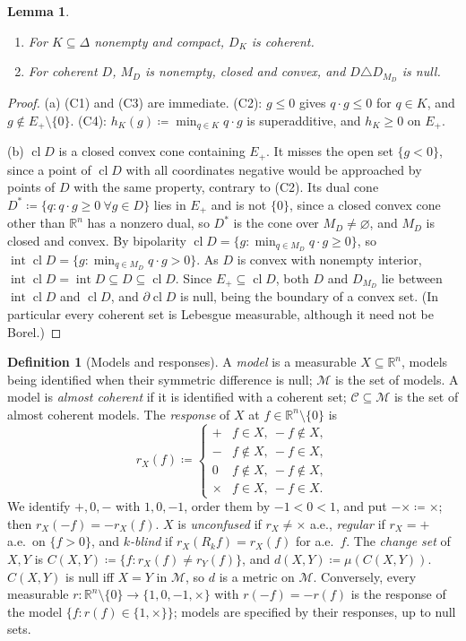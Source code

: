 \documentclass[11pt]{article}
\newcommand{\chg}[1]{{\color{red}#1}}
\newtheorem{lemma}[theorem]{Lemma}
\theoremstyle{definition}
\newtheorem{definition}[theorem]{Definition}
\theoremstyle{remark}
\newcommand{\M}{\mathcal M}
\newcommand{\C}{\mathcal C}
\newcommand{\R}{\mathbb R}
\newcommand{\interior}{\operatorname{int}}
\newcommand{\bd}{\partial}
\newcommand{\cl}{\operatorname{cl}}
\newcommand{\conf}{\times}
\begin{document}
\begin{lemma}\label{lem:credal}
\begin{enumerate}[label=\textup{(\alph*)}]
\item For $K\subseteq\Delta$ nonempty and compact, $D_K$ is coherent.
\item For coherent $D$, $M_D$ is nonempty, closed and convex, and $D\triangle D_{M_D}$ is null.
\end{enumerate}
\end{lemma}
\begin{proof}
(a) (C1) and (C3) are immediate. (C2): $g\le0$ gives $q\cdot g\le0$ for $q\in K$, and $g\notin E_+\setminus\{0\}$. (C4): $h_K(g)\coloneqq\min_{q\in K}q\cdot g$ is superadditive, and $h_K\ge0$ on $E_+$.

(b) $\cl D$ is a closed convex cone containing $E_+$. It misses the open set $\{g<0\}$, since a point of $\cl D$ with all coordinates negative would be approached by points of $D$ with the same property, contrary to (C2). Its dual cone $D^\ast\coloneqq\{q:q\cdot g\ge0\ \forall g\in D\}$ lies in $E_+$ and is not $\{0\}$\chg{, since a closed convex cone other than $\R^n$ has a nonzero dual}, so $D^\ast$ is the cone over $M_D\neq\varnothing$, and $M_D$ is closed and convex. By bipolarity $\cl D=\{g:\min_{q\in M_D}q\cdot g\ge0\}$, so $\interior\cl D=\{g:\min_{q\in M_D}q\cdot g>0\}$. As $D$ is convex with nonempty interior, $\interior\cl D=\interior D\subseteq D\subseteq\cl D$. Since $E_+\subseteq\cl D$, both $D$ and $D_{M_D}$ lie between $\interior\cl D$ and $\cl D$, and $\bd\cl D$ is null, being the boundary of a convex set. \chg{(In particular every coherent set is Lebesgue measurable, although it need not be Borel.)}
\end{proof}

\begin{definition}[Models and responses]\label{def:models}
A \emph{model} is a measurable $X\subseteq\R^n$, models being identified when their symmetric difference is null; $\M$ is the set of models. A model is \emph{almost coherent} if it is identified with a coherent set; $\C\subseteq\M$ is the set of almost coherent models. The \emph{response} of $X$ at $f\in\R^n\setminus\{0\}$ is
\[
r_X(f)\coloneqq\begin{cases}+&f\in X,\ -f\notin X,\\-&f\notin X,\ -f\in X,\\0&f\notin X,\ -f\notin X,\\\conf&f\in X,\ -f\in X.\end{cases}
\]
We identify $+,0,-$ with $1,0,-1$, order them by $-1<0<1$, and put $-\conf\coloneqq\conf$; then $r_X(-f)=-r_X(f)$. $X$ is \emph{unconfused} if $r_X\neq\conf$ a.e., \emph{regular} if $r_X=+$ a.e.\ on $\{f>0\}$, and \emph{$k$-blind} if $r_X(R_kf)=r_X(f)$ for a.e.\ $f$. The \emph{change set} of $X,Y$ is $C(X,Y)\coloneqq\{f:r_X(f)\neq r_Y(f)\}$, and $d(X,Y)\coloneqq\mu(C(X,Y))$. $C(X,Y)$ is null iff $X=Y$ in $\M$, so $d$ is a metric on $\M$. \chg{Conversely, every measurable $r:\R^n\setminus\{0\}\to\{1,0,-1,\conf\}$ with $r(-f)=-r(f)$ is the response of the model $\{f:r(f)\in\{1,\conf\}\}$; models are specified by their responses, up to null sets.}
\end{definition}
\end{document}

